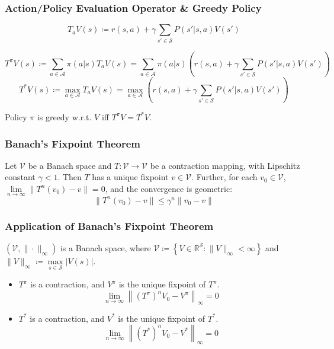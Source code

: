 \documentclass[UTF8,11pt,colorlinks,compress,openany]{beamer}%
\begin{document}
\begin{frame}\frametitle{Action/Policy Evaluation Operator \& Greedy Policy}
	\begin{definition}
		\[T_aV(s)\coloneqq r(s,a)+\gamma\sum\limits_{s'\in\mathcal{S}}P(s'|s,a)V(s')\]
	\end{definition}
\setlength\abovedisplayskip{0pt}
\setlength\belowdisplayskip{0pt}
	\begin{definition}
		\[T^\pi V(s)\coloneqq \sum\limits_{a\in\mathcal{A}}\pi(a|s)T_aV(s)=\sum\limits_{a\in\mathcal{A}}\pi(a|s)\left(r(s,a)+\gamma\sum\limits_{s'\in\mathcal{S}}P(s'|s,a)V(s')\right)\]
		\[T^* V(s)\coloneqq \max\limits_{a\in\mathcal{A}}T_aV(s)=\max\limits_{a\in\mathcal{A}}\left(r(s,a)+\gamma\sum\limits_{s'\in\mathcal{S}}P(s'|s,a)V(s')\right)\]
	\end{definition}
	\begin{definition}
		Policy $\pi$ is greedy w.r.t. $V$ iff $T^\pi V=T^* V$.
	\end{definition}	
\end{frame}

\begin{frame}\frametitle{Banach's Fixpoint Theorem}
	\begin{theorem}
		Let $\mathcal{V}$ be a Banach space and $T:\mathcal{V}\to\mathcal{V}$ be a contraction mapping, with Lipschitz constant $\gamma<1$. Then $T$ has a unique fixpoint $v\in\mathcal{V}$. Further, for each $v_0\in\mathcal{V}$, $\lim\limits_{n\to\infty}\|T^n(v_0)-v\|=0$, and the convergence is geometric:
		\[\|T^n(v_0)-v\|\leq\gamma^n\|v_0-v\|\]
	\end{theorem}
\end{frame}

\begin{frame}\frametitle{Application of Banach's Fixpoint Theorem}
	\begin{theorem}
		$(\mathcal{V},\|\cdot\|_\infty)$ is a Banach space, where
		$\mathcal{V}\coloneqq \left\{V\in\mathbb{R}^{\mathcal{S}}: \|V\|_\infty<\infty\right\}$ and $\|V\|_\infty\coloneqq \max\limits_{s\in\mathcal{S}}|V(s)|$.
	\end{theorem}
	\begin{block}{}
		\begin{itemize}
			\item $T^\pi$ is a contraction, and $V^\pi$ is the unique fixpoint of $T^\pi$.
			\[\lim\limits_{n\to\infty}\left\|(T^\pi)^nV_0-V^\pi\right\|_\infty=0\]
			\item $T^*$ is a contraction, and $V^*$ is the unique fixpoint of $T^*$.
			\[\lim\limits_{n\to\infty}\left\|(T^*)^nV_0-V^*\right\|_\infty=0\]
		\end{itemize}
	\end{block}
\end{frame}
\end{document}
